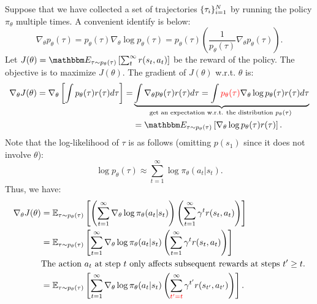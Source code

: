 Suppose that we have collected a set of trajectories $\{ \tau_i \}_{i=1}^{N}$ by running the policy $\pi_{\theta}$ multiple times.
A convenient identify is below:
    \begin{equation}
        \nabla_\theta p_\theta(\tau) = p_{\theta}(\tau)\nabla_{\theta}\log p_{\theta}(\tau) =  p_\theta(\tau) \left( \frac{1}{p_\theta(\tau)} \nabla_\theta p_\theta(\tau) \right).
    \end{equation}
Let $J(\theta) = \E_{\tau \sim p_\theta(\tau)}\left[ \sum_{t}^{\infty}{r(s_t, a_t)} \right]$ be the reward of the policy.
The objective is to maximize $J(\theta)$.
The gradient of $J(\theta)$ w.r.t. $\theta$ is:
    \begin{equation}
        \begin{aligned}
         \nabla_\theta J(\theta) = \nabla_\theta \left[ \int p_\theta(\tau) r(\tau) d\tau \right] = & \underbrace{ \int \nabla_\theta p_\theta(\tau) r(\tau) d\tau    = \int \textcolor{red}{p_{\theta}(\tau)} \nabla_{\theta}\log p_{\theta}(\tau)  r(\tau) d\tau }_{\text{get an expectation w.r.t. the distribution $p_{\theta}(\tau)$ }} \\
         & = \E_{\tau \sim p_\theta(\tau)} \left[ \nabla_\theta \log p_\theta(\tau) r(\tau) \right].
        \end{aligned}
    \end{equation}
Note that the log-likelihood of $\tau$ is as follows (omitting $p(s_1)$ since it does not involve $\theta$):
    \begin{equation}
        \log p_\theta(\tau) \approx \sum_{t=1}^{\infty}{\log \pi_{\theta}(a_t | s_t)}.
    \end{equation}
Thus, we have:
\begin{equation}
    \begin{aligned}
        \nabla_\theta J(\theta) & = \mathbb{E}_{\tau \sim p_\theta(\tau)}\left[ \left( \sum_{t=1}^{\infty} \nabla_\theta \log \pi_{\theta}(a_t | s_t) \right) \left( \sum_{t=1}^{\infty} \gamma^t r(s_t, a_t) \right) \right] \\
        & = \mathbb{E}_{\tau \sim p_\theta(\tau)}\left[ \sum_{t=1}^{\infty} \nabla_\theta \log \pi_{\theta}(a_t | s_t) \left( \sum_{t=1}^{\infty} \gamma^t r(s_t, a_t) \right) \right] \\
        & \text{The action $a_t$ at step $t$ only affects subsequent rewards at steps $t^\prime \ge t$.} \\ 
        & = \mathbb{E}_{\tau \sim p_\theta(\tau)}\left[ \sum_{t=1}^{\infty} \nabla_\theta \log \pi_{\theta}(a_t | s_t) \left( \sum_{ \textcolor{red}{t^\prime = t} }^{\infty} \gamma^{t^\prime} r(s_{t^\prime}, a_{t^\prime}) \right) \right].
    \end{aligned}
\end{equation}


